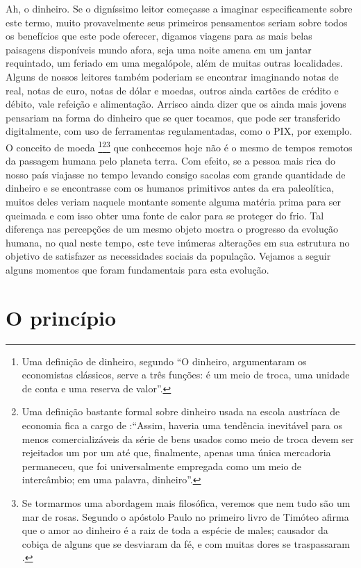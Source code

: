 Ah, o dinheiro. Se o digníssimo leitor começasse a imaginar especificamente sobre este termo, muito provavelmente seus primeiros pensamentos seriam sobre todos os benefícios que este pode oferecer, digamos viagens para as mais belas paisagens disponíveis mundo afora, seja uma noite amena em um jantar requintado, um feriado em uma megalópole, além de muitas outras localidades. Alguns de nossos leitores também poderiam se encontrar imaginando notas de real, notas de euro, notas de dólar e moedas, outros ainda cartões de crédito e débito, vale refeição e alimentação. Arrisco ainda dizer que os ainda mais jovens pensariam na forma do dinheiro que se quer tocamos, que pode ser transferido digitalmente, com uso de ferramentas regulamentadas, como o PIX, por exemplo.  O conceito de moeda \footnote{Uma definição de dinheiro, segundo \cite{KRUNGMAN} ``O dinheiro, argumentaram os economistas clássicos, serve a três funções: é um meio de troca, uma unidade de conta e uma reserva de valor''.}\footnote{Uma definição bastante formal sobre dinheiro usada na escola austríaca de economia fica a cargo de \cite{MISESA}:``Assim, haveria uma tendência inevitável para os menos comercializáveis ​​da série de bens usados ​​como meio de troca devem ser rejeitados um por um até que, finalmente, apenas uma única mercadoria permaneceu, que foi universalmente empregada como um meio de intercâmbio; em uma palavra, dinheiro''.}\footnote{ Se tormarmos uma abordagem mais filosófica, veremos que nem tudo são um mar de rosas. Segundo o apóstolo Paulo no primeiro livro de Timóteo afirma que o amor ao dinheiro é a raiz de toda a espécie de males; causador da cobiça de alguns que se desviaram da fé, e com muitas dores se traspassaram \cite{BIBLE1}.} que conhecemos hoje não é o mesmo de tempos remotos da passagem humana pelo planeta terra. Com efeito, se a pessoa mais rica do nosso país viajasse no tempo levando consigo sacolas com grande quantidade de dinheiro e se encontrasse com os humanos primitivos antes da era paleolítica, muitos deles veriam naquele montante somente alguma matéria prima para ser queimada e com isso obter uma fonte de calor para se proteger do frio. Tal diferença nas percepções de um mesmo objeto mostra o progresso da evolução humana, no qual neste tempo, este teve inúmeras alterações em sua estrutura no objetivo de satisfazer as necessidades sociais da população. Vejamos a seguir alguns momentos que foram fundamentais para esta evolução. 

\section{O princípio}

